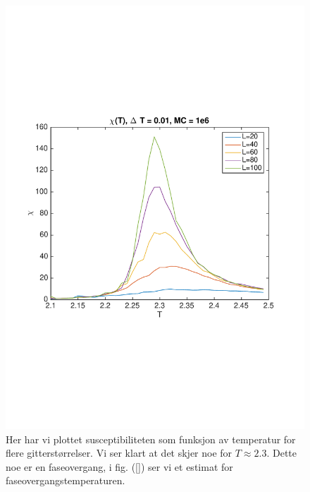 \documentclass[norsk, 10pt]{article}
\begin{document}
\begin{figure}[H]
	\centering
	\includegraphics[scale = 0.6, trim = 1cm 8cm 1cm 8cm]{chi_difftemp.pdf}
	\caption{Her har vi plottet susceptibiliteten som funksjon av temperatur for flere gitterstørrelser. Vi ser klart at det skjer noe for $T\approx 2.3$. Dette noe er en faseovergang, i fig. (\ref{}) ser vi et estimat for faseovergangstemperaturen.}
	\label{fig:chi_difftemp}
\end{figure}
\end{document}

